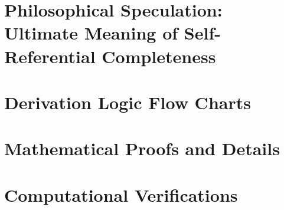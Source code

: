 \documentclass[12pt,a4paper]{book}
\theoremstyle{definition}
\theoremstyle{colored}
\begin{document}
\chapter{Philosophical Speculation: Ultimate Meaning of Self-Referential Completeness}
\label{ch:philosophy}


\appendix

\chapter{Derivation Logic Flow Charts}
\label{app:flowcharts}


\chapter{Mathematical Proofs and Details}
\label{app:proofs}


\chapter{Computational Verifications}
\label{app:computational}





\printindex
\end{document}
